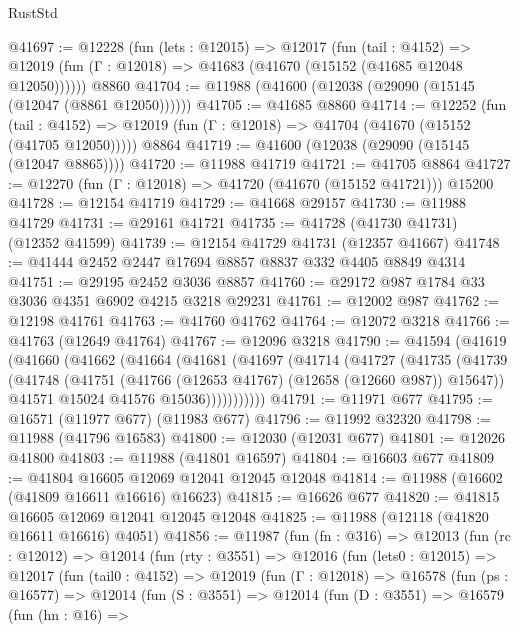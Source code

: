 \begin{lexlean}{RustStd}
\begin{coremodule}
@41697 := @12228
    (fun (lets : @12015) =>
    @12017
      (fun (tail : @4152) =>
      @12019 (fun (Γ : @12018) => @41683 (@41670 (@15152 (@41685 @12048 @12050))))))
    @8860
@41704 := @11988 (@41600 (@12038 (@29090 (@15145 (@12047 (@8861 @12050))))))
@41705 := @41685 @8860
@41714 := @12252
    (fun (tail : @4152) => @12019 (fun (Γ : @12018) => @41704 (@41670 (@15152 (@41705 @12050)))))
    @8864
@41719 := @41600 (@12038 (@29090 (@15145 (@12047 @8865))))
@41720 := @11988 @41719
@41721 := @41705 @8864
@41727 := @12270 (fun (Γ : @12018) => @41720 (@41670 (@15152 @41721))) @15200
@41728 := @12154 @41719
@41729 := @41668 @29157
@41730 := @11988 @41729
@41731 := @29161 @41721
@41735 := @41728 (@41730 @41731) (@12352 @41599)
@41739 := @12154 @41729 @41731 (@12357 @41667)
@41748 := @41444 @2452 @2447 @17694 @8857 @8837 @332 @4405 @8849 @4314
@41751 := @29195 @2452 @3036 @8857
@41760 := @29172 @987 @1784 @33 @3036 @4351 @6902 @4215 @3218 @29231
@41761 := @12002 @987
@41762 := @12198 @41761
@41763 := @41760 @41762
@41764 := @12072 @3218
@41766 := @41763 (@12649 @41764)
@41767 := @12096 @3218
@41790 := @41594
    (@41619
      (@41660
        (@41662
          (@41664
            (@41681
              (@41697
                (@41714
                  (@41727
                    (@41735
                      (@41739
                        (@41748
                          (@41751 (@41766 (@12653 @41767) (@12658 (@12660 @987)) @15647))
                          @41571
                          @15024
                          @41576
                          @15036)))))))))))
@41791 := @11971 @677
@41795 := @16571 (@11977 @677) (@11983 @677)
@41796 := @11992 @32320
@41798 := @11988 (@41796 @16583)
@41800 := @12030 (@12031 @677)
@41801 := @12026 @41800
@41803 := @11988 (@41801 @16597)
@41804 := @16603 @677
@41809 := @41804 @16605 @12069 @12041 @12045 @12048
@41814 := @11988 (@16602 (@41809 @16611 @16616) @16623)
@41815 := @16626 @677
@41820 := @41815 @16605 @12069 @12041 @12045 @12048
@41825 := @11988 (@12118 (@41820 @16611 @16616) @4051)
@41856 := @11987
    (fun (fn : @316) =>
    @12013
      (fun (rc : @12012) =>
      @12014
        (fun (rty : @3551) =>
        @12016
          (fun (lets0 : @12015) =>
          @12017
            (fun (tail0 : @4152) =>
            @12019
              (fun (Γ : @12018) =>
              @16578
                (fun (ps : @16577) =>
                @12014
                  (fun (S : @3551) =>
                  @12014
                    (fun (D : @3551) =>
                    @16579
                      (fun (hn : @16) =>

\end{coremodule}
\end{lexlean}
